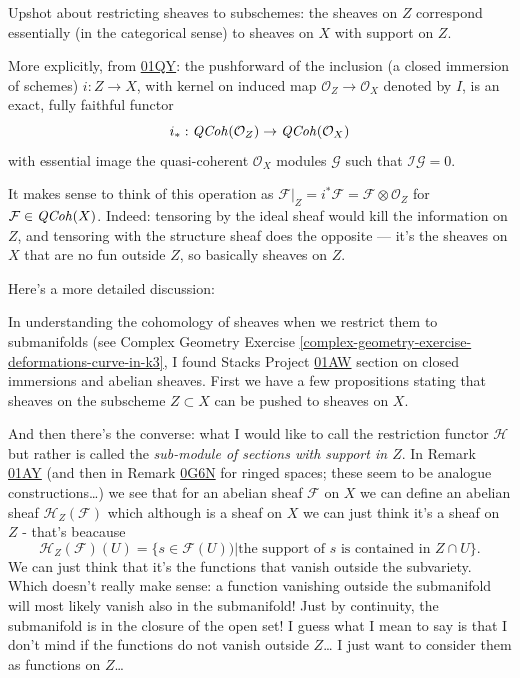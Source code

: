 \noindent
Upshot about restricting sheaves to subschemes:
the sheaves on $Z$ correspond essentially
(in the categorical sense)
to sheaves on $X$ with support on $Z$.

More explicitly, from \href{https://stacks.math.columbia.edu/tag/01QY}{01QY}:
the pushforward of the inclusion (a closed immersion of schemes)
$i:Z \to X$, with kernel on induced map $\mathcal{O}_Z \to \mathcal{O}_X$ 
denoted by $I$, is an exact, fully faithful functor
$$
i_*:\mathit{QCoh}(\mathcal{O}_Z) \to \mathit{QCoh}(\mathcal{O}_X)
$$
with essential image the quasi-coherent $\mathcal{O}_X$ modules
$\mathcal{G}$ such that $\mathcal{I}\mathcal{G}=0$.

It makes sense to think of this operation as
$\mathcal{F}|_Z=i^*\mathcal{F}=\mathcal{F}\otimes\mathcal{O}_Z$
for $\mathcal{F}\in\mathit{QCoh}(X)$.
Indeed: tensoring by the ideal sheaf would kill the information on $Z$,
and tensoring with the structure sheaf does the opposite
--- it's the sheaves on $X$ that are no fun outside $Z$,
so basically sheaves on $Z$.

\medskip\noindent
Here's a more detailed discussion:

In understanding the cohomology of sheaves when
we restrict them to submanifolds (see Complex Geometry
Exercise \ref{complex-geometry-exercise-deformations-curve-in-k3},
I found Stacks Project 
\href{https://stacks.math.columbia.edu/tag/01AW}{01AW}
section on closed immersions and abelian sheaves.
First we have a few propositions stating that
sheaves on the subscheme $Z \subset X$ can be pushed
to sheaves on $X$.

And then there's the converse: 
what I would like to call the restriction functor $\mathcal{H}$
but rather is called the {\it sub-module of sections with support in $Z$}.
In Remark \href{https://stacks.math.columbia.edu/tag/01AY}{01AY}
(and then in Remark \href{https://stacks.math.columbia.edu/tag/0G6N}{0G6N}
for ringed spaces; these seem to be analogue constructions…)
we see that for an abelian sheaf $\mathcal{F}$ on $X$
we can define an abelian sheaf $\mathcal{H}_Z(\mathcal{F})$
which although is a sheaf on $X$ 
we can just think it's a sheaf on $Z$ - that's beacause
$$
\mathcal{H}_Z(\mathcal{F})(U)
=\{s \in \mathcal{F}(U))| \text{the support of $s$ is contained in }Z\cap U\}.
$$
We can just think that it's the functions
that vanish outside the subvariety.
Which doesn't really make sense:
a function vanishing outside the submanifold will most likely
vanish also in the submanifold! Just by continuity,
the submanifold is in the closure of the open set!
I guess what I mean to say is that I don't mind if
the functions do not vanish outside $Z$…
I just want to consider them as functions on $Z$…

